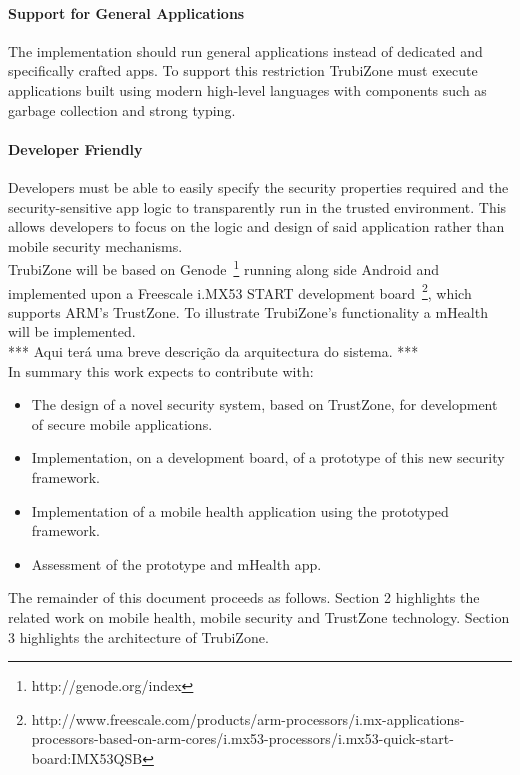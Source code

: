 \paragraph*{\textbf{Support for General Applications\\}}
The implementation should run general applications instead of dedicated and specifically crafted apps. To support this restriction TrubiZone must execute applications built using modern high-level languages with components such as garbage collection and strong typing.

\paragraph*{\textbf{Developer Friendly\\}}
Developers must be able to easily specify the security properties required and the security-sensitive app logic to transparently run in the trusted environment. This allows developers to focus on the logic and design of said application rather than mobile security mechanisms.\\

TrubiZone will be based on Genode~\footnote{http://genode.org/index} running along side Android and implemented upon a Freescale i.MX53 START development board~\footnote{http://www.freescale.com/products/arm-processors/i.mx-applications-processors-based-on-arm-cores/i.mx53-processors/i.mx53-quick-start-board:IMX53QSB}, which supports ARM's TrustZone. To illustrate TrubiZone's functionality a \ac{mHealth} will be implemented.\\

*** Aqui terá uma breve descrição da arquitectura do sistema. ***\\

In summary this work expects to contribute with:
\begin{itemize}
	\item The design of a novel security system, based on TrustZone, for development of secure mobile applications.
	\item Implementation, on a development board, of a prototype of this new security framework.
	\item Implementation of a mobile health application using the prototyped framework.
	\item Assessment of the prototype and \ac{mHealth} app.
\end{itemize}

The remainder of this document proceeds as follows. Section 2 highlights the related work on mobile health, mobile security and TrustZone technology. Section 3 highlights the architecture of TrubiZone.
